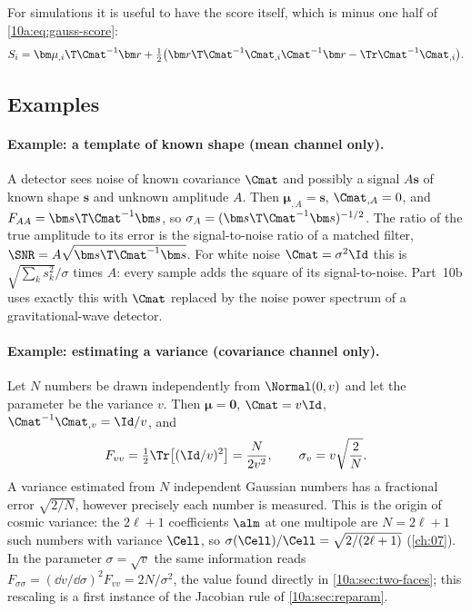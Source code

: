 For simulations it is useful to have the score itself, which is minus one half of \eqref{10a:eq:gauss-score}:
\begin{equation}
  S_i=\bm\mu_{,i}\T\Cmat^{-1}\bm r+\tfrac12\bigl(\bm r\T\Cmat^{-1}\Cmat_{,i}\Cmat^{-1}\bm r-\Tr\Cmat^{-1}\Cmat_{,i}\bigr).
  \label{10a:eq:gauss-S}
\end{equation}

\subsection{Examples}
\label{10a:sec:gauss-ex}

\paragraph{Example: a template of known shape (mean channel only).} A detector sees noise of known covariance
$\Cmat$ and possibly a signal $A\bm s$ of known shape $\bm s$ and unknown amplitude $A$. Then $\bm\mu_{,A}=\bm s$,
$\Cmat_{,A}=0$, and $F_{AA}=\bm s\T\Cmat^{-1}\bm s$, so $\sigma_A=(\bm s\T\Cmat^{-1}\bm s)^{-1/2}$. The ratio of the true
amplitude to its error is the signal-to-noise ratio of a matched filter, $\SNR=A\sqrt{\bm s\T\Cmat^{-1}\bm s}$. For
white noise $\Cmat=\sigma^2\Id$ this is $\sqrt{\sum_ks_k^2}/\sigma$ times $A$: every sample adds the square of its
signal-to-noise. Part~10b uses exactly this with $\Cmat$ replaced by the noise power spectrum of a gravitational-wave
detector.

\paragraph{Example: estimating a variance (covariance channel only).} Let $N$ numbers be drawn independently from
$\Normal(0,v)$ and let the parameter be the variance $v$. Then $\bm\mu=\bm0$, $\Cmat=v\Id$, $\Cmat^{-1}\Cmat_{,v}=\Id/v$,
and
\[
  F_{vv}=\tfrac12\Tr\bigl[(\Id/v)^2\bigr]=\frac N{2v^2},
  \qquad
  \sigma_v=v\sqrt{\frac2N}.
\]
A variance estimated from $N$ independent Gaussian numbers has a fractional error $\sqrt{2/N}$, however
precisely each number is measured. This is the origin of cosmic variance: the $2\ell+1$ coefficients $\alm$ at
one multipole are $N=2\ell+1$ such numbers with variance $\Cell$, so $\sigma(\Cell)/\Cell=\sqrt{2/(2\ell+1)}$
(\cref{ch:07}). In the parameter $\sigma=\sqrt v$ the same information reads $F_{\sigma\sigma}=(\dd v/\dd\sigma)^2F_{vv}=2N/\sigma^2$,
the value found directly in \cref{10a:sec:two-faces}; this rescaling is a first instance of the
Jacobian rule of \cref{10a:sec:reparam}.

